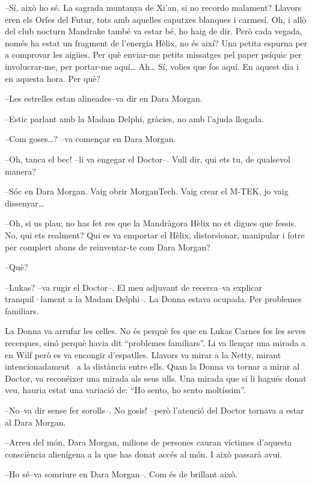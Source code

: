 --Sí, això ho sé. La sagrada muntanya de Xi'an, si no recordo malament?
Llavors eren els Orfes del Futur, tots amb aquelles caputxes blanques i
carmesí. Oh, i allò del club nocturn Mandrake també va estar bé, ho haig
de dir. Però cada vegada, només ha estat un fragment de l'energia Hèlix,
no és així? Una petita espurna per a comprovar les aigües. Per què
enviar-me petits missatges pel paper psíquic per involucrar-me, per
portar-me aquí\ldots{} Ah\ldots{} Sí, volies que fos aquí. En aquest dia
i en aquesta hora. Per què?

--Les estrelles estan alineades--va dir en Dara Morgan.

--Estic parlant amb la Madam Delphi, gràcies, no amb l'ajuda llogada.

--Com goses\ldots{}? --va començar en Dara Morgan.

--Oh, tanca el bec! --li va engegar el Doctor--. Vull dir, qui ets tu,
de qualsevol manera?

--Sóc en Dara Morgan. Vaig obrir MorganTech. Vaig crear el M-TEK, jo
vaig dissenyar\ldots{}

--Oh, si us plau; no has fet res que la Mandràgora Hèlix no et digues
que fessis. No, qui ets realment? Qui es va emportar el Hèlix,
distorsionar, manipular i fotre per complert abans de reinventar-te com
Dara Morgan?

--Què?

--Lukas? --va rugir el Doctor--. El meu adjuvant de recerca--va explicar
tranquil·lament a la Madam Delphi--. La Donna estava ocupada. Per
problemes familiars.

La Donna va arrufar les celles. No és perquè fes que en Lukas Carnes fes
les seves recerques, sinó perquè havia dit ``problemes familiars''. Li
va llençar una mirada a en Wilf però es va encongir d'espatlles. Llavors
va mirar a la Netty, mirant intencionadament ~a la distància entre ells.
Quan la Donna va tornar a mirar al Doctor, va reconéixer una mirada als
seus ulls. Una mirada que si li hagués donat veu, hauria estat una
variació de: ``Ho sento, ho sento moltíssim''.

--No--va dir sense fer sorolls--. No gosis! --però l'atenció del Doctor
tornava a estar al Dara Morgan.

--Arreu del món, Dara Morgan, milions de persones cauran víctimes
d'aquesta consciència alienígena a la que has donat accés al món. I això
passarà avui.

--Ho sé--va somriure en Dara Morgan--. Com és de brillant això.

